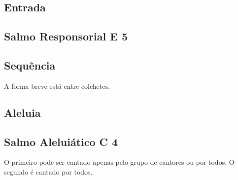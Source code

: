 
\subsection{Entrada}\label{subsection:tempus-per-annum/sanctissimi-corporis-et-sanguinis-christi/introitus}

\AllowPageFlush

\subsection[Salmo Responsorial]{Salmo Responsorial \textmd{E 5}}\label{subsection:tempus-per-annum/sanctissimi-corporis-et-sanguinis-christi/psalmus-responsorius}

\subsection{Sequência}\label{subsection:tempus-per-annum/sanctissimi-corporis-et-sanguinis-christi/sequentia}
\begin{rubrica}
  A forma breve está entre colchetes.
\end{rubrica}

\subsection{Aleluia}\label{subsection:tempus-per-annum/sanctissimi-corporis-et-sanguinis-christi/alleluia}

\AllowPageFlush

\subsection[Salmo Aleluiático]{Salmo Aleluiático \textmd{C 4}}\label{subsection:tempus-per-annum/sanctissimi-corporis-et-sanguinis-christi/psalmus-alleluiaticus}
\begin{rubrica}
  O primeiro {\normalfont\Rbar} pode ser cantado apenas pelo grupo de cantores ou por todos. O segundo {\normalfont\Rbar} é cantado por todos.
\end{rubrica}

\AllowPageFlush

